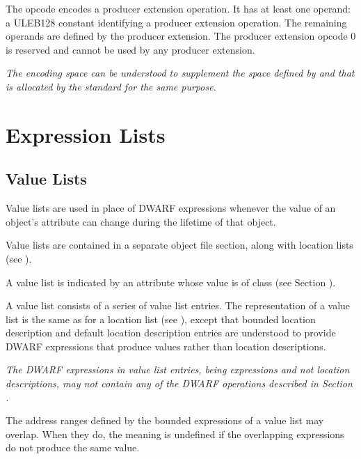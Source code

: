 \begin{enumerate}[1. ]
\bb
\itembfnl{\DWOPuserextendedTARG}
The \DWOPuserextendedNAME{} opcode encodes a
\bb
producer
\eb
extension operation.
It has at least one operand: a ULEB128 constant identifying a
\bb
producer
\eb
extension operation. The remaining operands are defined by the
\bb
producer
\eb
extension. The
\bb
producer
\eb
extension opcode 0 is reserved and cannot be used by any
\bb
producer
\eb
extension.

\textit{The \DWOPuserextended{} encoding space can be understood to supplement
the space defined by \DWOPlouser{} and \DWOPhiuser{} that is allocated by
the standard for the same purpose.}
\eb

\end{enumerate}

\section{Expression Lists}
\label{chap:expressionlists}
\bb

\subsection{Value Lists}
\label{chap:valuelists}
Value lists are used in place of
DWARF expressions whenever the value of an object's attribute
can change during the lifetime of that object.

Value lists are contained in a separate object file section,
along with location lists (see ).

A value list is indicated by an attribute whose value is of class
\label{chap:classvallist}\CLASSvallist{} (see Section ).

A value list consists of a series of value list entries.
The representation of a value list is the same as for a
location list (see ), except
that bounded location description and default location description
entries are understood to provide DWARF expressions that produce
values rather than location descriptions.

\textit{The DWARF expressions in value list entries, being
expressions and not location descriptions, may not contain
any of the DWARF operations described in Section
.}

The address ranges defined by the bounded expressions of a
value list may overlap. When they do, the meaning is undefined
if the overlapping expressions do not produce the same value.
\eb

